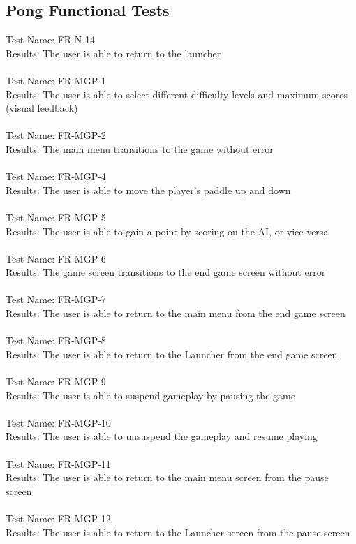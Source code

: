 \documentclass[12pt, titlepage]{article}
\begin{document}
\subsection{Pong Functional Tests}
	Test Name: FR-N-14 \\
	Results: The user is able to return to the launcher \\ \\
	Test Name: FR-MGP-1 \\
	Results: The user is able to select different difficulty levels and maximum scores (visual feedback) \\ \\
	Test Name: FR-MGP-2 \\
	Results: The main menu transitions to the game without error \\ \\
	Test Name: FR-MGP-4 \\
	Results: The user is able to move the player's paddle up and down\\ \\
	Test Name: FR-MGP-5 \\
	Results: The user is able to gain a point by scoring on the AI, or vice versa \\ \\ 
	Test Name: FR-MGP-6 \\ 
	Results: The game screen transitions to the end game screen without error \\ \\
	Test Name: FR-MGP-7 \\
	Results: The user is able to return to the main menu from the end game screen \\ \\
	Test Name: FR-MGP-8 \\ 
	Results: The user is able to return to the Launcher from the end game screen\\ \\
	Test Name: FR-MGP-9 \\
	Results: The user is able to suspend gameplay by pausing the game \\ \\
	Test Name: FR-MGP-10 \\
	Results: The user is able to unsuspend the gameplay and resume playing \\ \\
	Test Name: FR-MGP-11 \\
	Results: The user is able to return to the main menu screen from the pause screen \\ \\
	Test Name: FR-MGP-12 \\
	Results: The user is able to return to the Launcher screen from the pause screen \\
	
\end{document}
